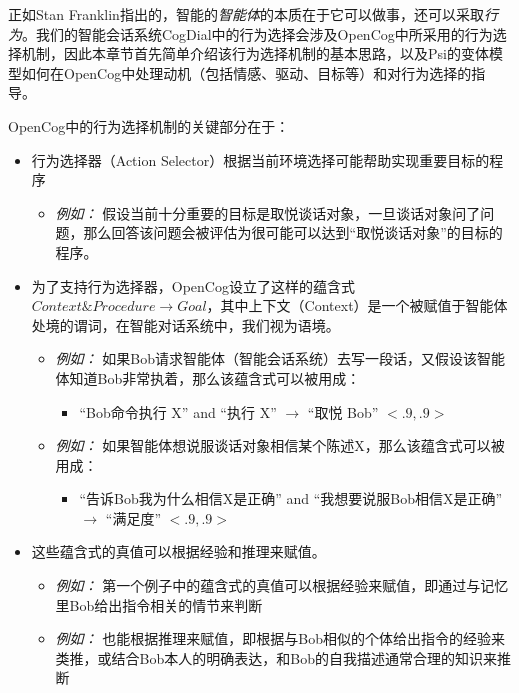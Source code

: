 正如Stan Franklin\cite{Franklin1995}指出的，智能的{\it 智能体}的本质在于它可以做事，还可以采取{\it 行为}。我们的智能会话系统CogDial中的行为选择会涉及OpenCog中所采用的行为选择机制\cite{EGI2}，因此本章节首先简单介绍该行为选择机制的基本思路，以及Psi的变体模型如何在OpenCog中处理动机（包括情感、驱动、目标等）和对行为选择的指导。

OpenCog中的行为选择机制的关键部分在于：

\begin{itemize}
\item 行为选择器（Action Selector）根据当前环境选择可能帮助实现重要目标的程序
\begin{itemize}
\item {\it 例如：} 假设当前十分重要的目标是取悦谈话对象，一旦谈话对象问了问题，那么回答该问题会被评估为很可能可以达到“取悦谈话对象”的目标的程序。
\end{itemize}

\item 为了支持行为选择器，OpenCog设立了这样的蕴含式$Context \& Procedure \rightarrow Goal$，其中上下文（Context）是一个被赋值于智能体处境的谓词，在智能对话系统中，我们视为语境。

\begin{itemize}
\item {\it 例如：} 如果Bob请求智能体（智能会话系统）去写一段话，又假设该智能体知道Bob非常执着，那么该蕴含式可以被用成：
 \begin{itemize}
 \item ``Bob命令执行 X''  and ``执行 X''  $\rightarrow$ ``取悦 Bob''  $<.9,.9>$
 \end{itemize}

\item {\it 例如：} 如果智能体想说服谈话对象相信某个陈述X，那么该蕴含式可以被用成：
 \begin{itemize}
 \item ``告诉Bob我为什么相信X是正确''  and ``我想要说服Bob相信X是正确''  $\rightarrow$ ``满足度''  $<.9,.9>$
 \end{itemize}

\end{itemize}
\item 这些蕴含式的真值可以根据经验和推理来赋值。
\begin{itemize}
\item {\it 例如：} 第一个例子中的蕴含式的真值可以根据经验来赋值，即通过与记忆里Bob给出指令相关的情节来判断
\item {\it 例如：} 也能根据推理来赋值，即根据与Bob相似的个体给出指令的经验来类推，或结合Bob本人的明确表达，和Bob的自我描述通常合理的知识来推断
\end{itemize}


\end{itemize}
